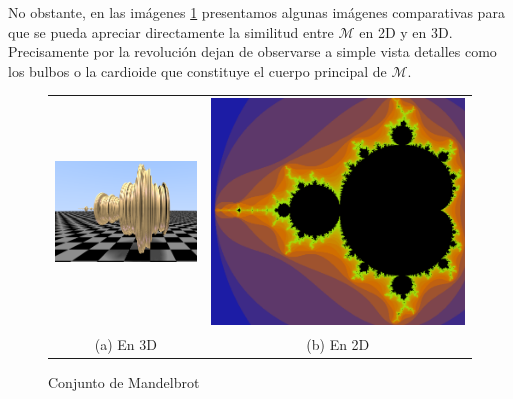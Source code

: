 No obstante, en las imágenes \ref{fig:mandelbrot-2D-3D} presentamos algunas imágenes comparativas para que se pueda apreciar directamente la similitud entre $\mathcal{M}$ en 2D y en 3D. Precisamente por la revolución dejan de observarse a simple vista detalles como los bulbos o la cardioide que constituye el cuerpo principal de $\mathcal{M}$.

\begin{figure}[ht]
    \centering
    \begin{tabular}{cc}
        \includegraphics[scale=0.53]{img/C9/mandelbrot-3d.png} &
        \includegraphics[scale=0.23]{img/C9/mandelbrot-2d.png} \\
          
    (a) En 3D & (b) En 2D  \\
    \end{tabular}
    \caption{Conjunto de Mandelbrot}
    \label{fig:mandelbrot-2D-3D}
\end{figure}

